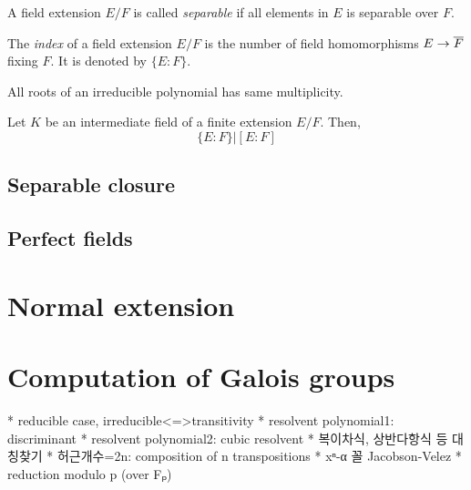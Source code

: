 \documentclass{../exp}
\begin{document}
\begin{defn}
A field extension $E/F$ is called \emph{separable} if all elements in $E$ is separable over $F$.
\end{defn}




\begin{defn}
The \emph{index} of a field extension $E/F$ is the number of field homomorphisms $E\to\cl F$ fixing $F$.
It is denoted by $\{E:F\}$.
\end{defn}

\begin{prop}
All roots of an irreducible polynomial has same multiplicity.
\end{prop}
\begin{pf}
\end{pf}

\begin{thm}
Let $K$ be an intermediate field of a finite extension $E/F$.
Then,
\[\{E:F\}|[E:F]\]
\end{thm}
\begin{pf}
\end{pf}





\subsection{Separable closure}





\subsection{Perfect fields}









\section{Normal extension}







\section{Computation of Galois groups}

 * reducible case, irreducible<=>transitivity
 * resolvent polynomial1: discriminant
 * resolvent polynomial2: cubic resolvent
 * 복이차식, 상반다항식 등 대칭찾기
 * 허근개수=2n: composition of n transpositions
 * xⁿ-α 꼴  Jacobson-Velez
 * reduction modulo p (over Fₚ)
\end{document}
